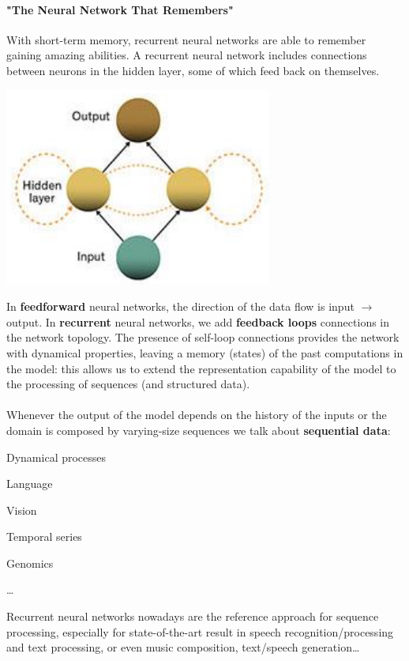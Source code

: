 \documentclass[10pt]{report}
\begin{document}
\paragraph{"The Neural Network That Remembers"} With short-term memory, recurrent neural networks are able to remember gaining amazing abilities. A recurrent neural network includes connections between neurons in the hidden layer, some of which feed back on themselves.
\begin{center}
	\includegraphics[scale=0.75]{33.png}
\end{center}
In \textbf{feedforward} neural networks, the direction of the data flow is input $\rightarrow$ output. In \textbf{recurrent} neural networks, we add \textbf{feedback loops} connections in the network topology. The presence of self-loop connections provides the network with dynamical properties, leaving a memory (states) of the past computations in the model: this allows us to extend the representation capability of the model to the processing of sequences (and structured data).\\\\
Whenever the output of the model depends on the history of the inputs or the domain is composed by varying-size sequences we talk about \textbf{sequential data}:
\begin{list}{}{}
	\item Dynamical processes
	\item Language
	\item Vision
	\item Temporal series
	\item Genomics
	\item \ldots
\end{list}
Recurrent neural networks nowadays are the reference approach for sequence processing, especially for state-of-the-art result in speech recognition/processing and text processing, or even music composition, text/speech generation\ldots\\
\end{document}
